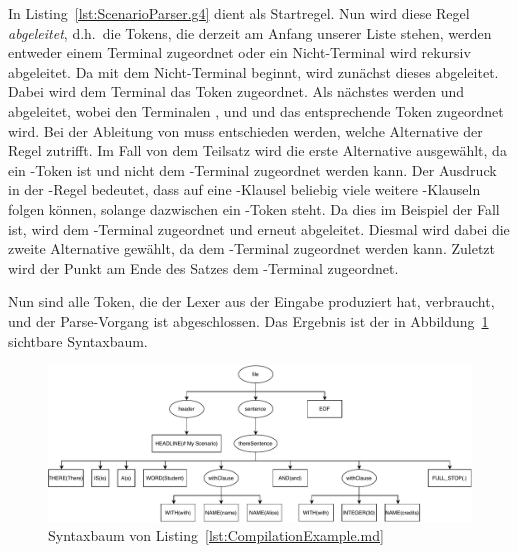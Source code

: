 In Listing~\ref{lst:ScenarioParser.g4} dient  als Startregel.
Nun wird diese Regel \emph{abgeleitet}, d.h.\ die Tokens, die derzeit am Anfang unserer Liste stehen, werden entweder einem Terminal zugeordnet oder ein Nicht-Terminal wird rekursiv abgeleitet.
Da  mit dem Nicht-Terminal  beginnt, wird zunächst dieses abgeleitet.
Dabei wird dem Terminal  das Token  zugeordnet.
Als nächstes werden  und  abgeleitet, wobei den Terminalen ,  und  und  das entsprechende Token zugeordnet wird.
Bei der Ableitung von  muss entschieden werden, welche Alternative der Regel zutrifft.
Im Fall von dem Teilsatz  wird die erste Alternative ausgewählt, da  ein -Token ist und nicht dem -Terminal zugeordnet werden kann.
Der Ausdruck  in der -Regel bedeutet, dass auf eine -Klausel beliebig viele weitere -Klauseln folgen können, solange dazwischen ein -Token steht.
Da dies im Beispiel der Fall ist, wird  dem -Terminal zugeordnet und  erneut abgeleitet.
Diesmal wird dabei die zweite Alternative gewählt, da  dem -Terminal zugeordnet werden kann.
Zuletzt wird der Punkt am Ende des Satzes dem -Terminal zugeordnet.

Nun sind alle Token, die der Lexer aus der Eingabe produziert hat, verbraucht, und der Parse-Vorgang ist abgeschlossen.
Das Ergebnis ist der in Abbildung~\ref{fig:parsetree} sichtbare Syntaxbaum.

\begin{figure}
    \includegraphics[width=\textwidth]{chapter/fulib-scenarios/img/parsetree.pdf}
    \caption{Syntaxbaum von Listing~\ref{lst:CompilationExample.md}}
    \label{fig:parsetree}
\end{figure}

